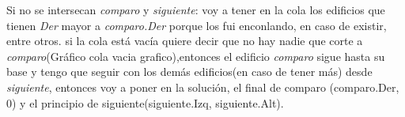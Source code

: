 \documentclass{article}
\begin{document}
Si no se intersecan \textit{comparo} y \textit{siguiente}:\newline
\color{red}{(grafico no se intersecan)} \color{black} \newline
        voy a tener en la cola los edificios que tienen \textit{Der} mayor a \textit{comparo.Der} porque los fui enconlando, en caso de existir, entre otros.\newline
        si la cola está vacía quiere decir que no hay nadie que corte a \textit{comparo}(Gráfico cola vacia grafico),entonces el edificio \textit{comparo} sigue hasta su base y tengo que seguir con los demás edificios(en caso de tener más) desde \textit{siguiente}, entonces voy a poner en la solución, el final de comparo (comparo.Der, 0) y el principio de siguiente(siguiente.Izq, siguiente.Alt).\newline
\end{document}

